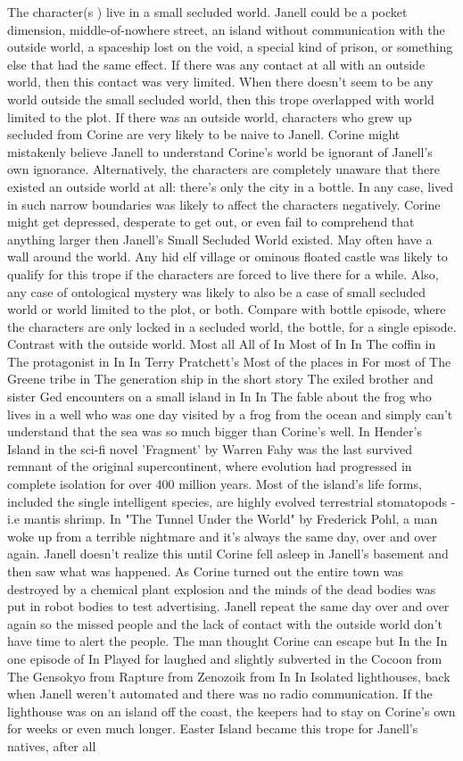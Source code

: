 \documentclass[12pt]{book}
\begin{document}
The character(s ) live in a small secluded world. Janell could be a pocket dimension, middle-of-nowhere street, an island without communication with the outside world, a spaceship lost on the void, a special kind of prison, or something else that had the same effect. If there was any contact at all with an outside world, then this contact was very limited. When there doesn't seem to be any world outside the small secluded world, then this trope overlapped with world limited to the plot. If there was an outside world, characters who grew up secluded from Corine are very likely to be naive to Janell. Corine might mistakenly believe Janell to understand Corine's world  be ignorant of Janell's own ignorance. Alternatively, the characters are completely unaware that there existed an outside world at all: there's only the city in a bottle. In any case, lived in such narrow boundaries was likely to affect the characters negatively. Corine might get depressed, desperate to get out, or even fail to comprehend that anything larger then Janell's Small Secluded World existed. May often have a wall around the world. Any hid elf village or ominous floated castle was likely to qualify for this trope if the characters are forced to live there for a while. Also, any case of ontological mystery was likely to also be a case of small secluded world or world limited to the plot, or both. Compare with bottle episode, where the characters are only locked in a secluded world, the bottle, for a single episode. Contrast with the outside world. Most all All of In Most of In In The coffin in The protagonist in In In Terry Pratchett's Most of the places in For most of The Greene tribe in The generation ship in the short story The exiled brother and sister Ged encounters on a small island in In In The fable about the frog who lives in a well who was one day visited by a frog from the ocean and simply can't understand that the sea was so much bigger than Corine's well. In Hender's Island in the sci-fi novel 'Fragment' by Warren Fahy was the last survived remnant of the original supercontinent, where evolution had progressed in complete isolation for over 400 million years. Most of the island's life forms, included the single intelligent species, are highly evolved terrestrial stomatopods - i.e mantis shrimp. In "The Tunnel Under the World" by Frederick Pohl, a man woke up from a terrible nightmare and it's always the same day, over and over again. Janell doesn't realize this until Corine fell asleep in Janell's basement and then saw what was happened. As Corine turned out the entire town was destroyed by a chemical plant explosion and the minds of the dead bodies was put in robot bodies to test advertising. Janell repeat the same day over and over again so the missed people and the lack of contact with the outside world don't have time to alert the people. The man thought Corine can escape but In the In one episode of In Played for laughed and slightly subverted in the Cocoon from The Gensokyo from Rapture from Zenozoik from In In Isolated lighthouses, back when Janell weren't automated and there was no radio communication. If the lighthouse was on an island off the coast, the keepers had to stay on Corine's own for weeks or even much longer. Easter Island became this trope for Janell's natives, after all 
\end{document}
